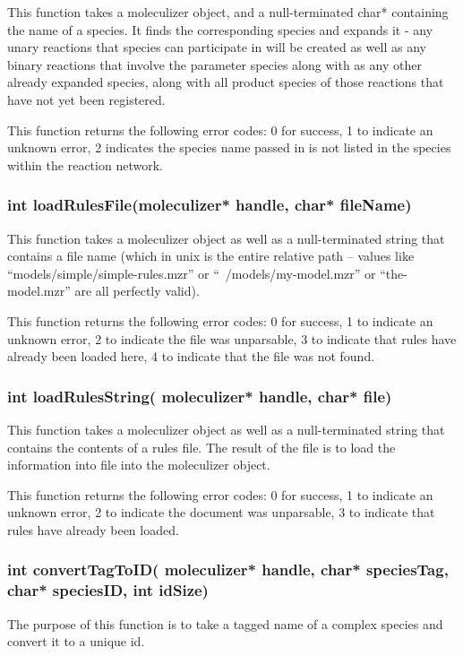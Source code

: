 This function takes a moleculizer object, and a null-terminated char*
containing the name of a species.  It finds the corresponding species
and expands it - any unary reactions that species can participate in
will be created as well as any binary reactions that involve the
parameter species along with as any other already expanded species, along
with all product species of those reactions that have not yet been
registered.  

This function returns the following error codes: 0 for success, 1 to
indicate an unknown error, 2 indicates the species name passed in is
not listed in the species within the reaction network.

\subsubsection{int loadRulesFile(moleculizer* handle, char* fileName)}
This function takes a moleculizer object as well as a null-terminated
string that contains a file name (which in unix is the entire relative
path -- values like ``models/simple/simple-rules.mzr'' or
``~/models/my-model.mzr'' or ``the-model.mzr'' are all perfectly
valid).

This function returns the following error codes: 0 for success, 1 to
indicate an unknown error, 2 to indicate the file was unparsable, 3 to
indicate that rules have already been loaded here, 4 to indicate that
the file was not found.

\subsubsection{int loadRulesString( moleculizer* handle, char* file)}
This function takes a moleculizer object as well as a null-terminated
string that contains the contents of a rules file.  The result of the
file is to load the information into file into the moleculizer object.

This function returns the following error codes: 0 for success, 1 to
indicate an unknown error, 2 to indicate the document was unparsable,
3 to indicate that rules have already been loaded.

\subsubsection{int convertTagToID( moleculizer* handle, char*
  speciesTag, char* speciesID, int idSize)}
The purpose of this function is to take a tagged name of a complex
species and convert it to a unique id.


